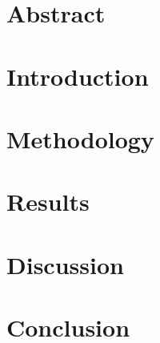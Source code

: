 \documentclass[12pt]{article}
\begin{document}
\section{Abstract}


\section{Introduction}


\section{Methodology}


\section{Results}


\section{Discussion}


\section{Conclusion}






\appendix

\end{document}
